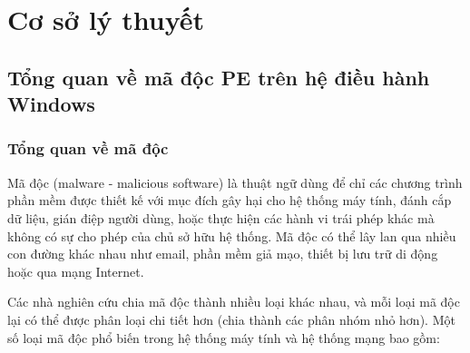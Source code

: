 \chapter{Cơ sở lý thuyết}




\section{Tổng quan về mã độc PE trên hệ điều hành Windows}




\subsection{Tổng quan về mã độc}

Mã độc (malware - malicious software) là thuật ngữ dùng để
chỉ các chương trình phần mềm được thiết kế với mục đích
gây hại cho hệ thống máy tính, đánh cắp dữ liệu, gián điệp
người dùng, hoặc thực hiện các hành vi trái phép khác mà
không có sự cho phép của chủ sở hữu hệ thống. Mã độc có
thể lây lan qua nhiều con đường khác nhau như email,
phần mềm giả mạo, thiết bị lưu trữ di động hoặc qua
mạng Internet.

Các nhà nghiên cứu chia mã độc thành nhiều loại khác nhau,
và mỗi loại mã độc lại có thể được phân loại chi tiết hơn
(chia thành các phân nhóm nhỏ hơn). Một số loại mã độc phổ
biến trong hệ thống máy tính và hệ thống mạng bao gồm: \cite{wikimalware}

